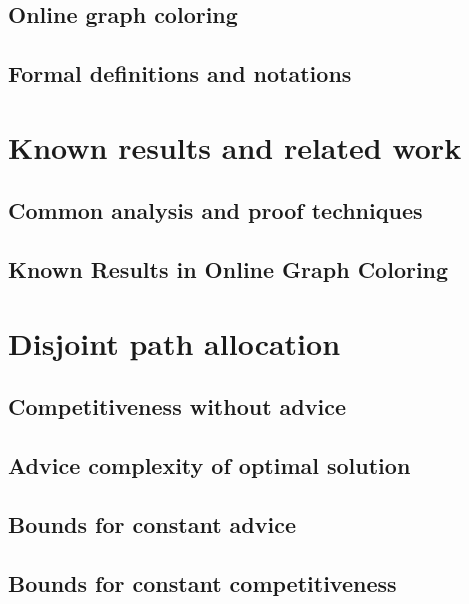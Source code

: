 \documentclass[12pt,a4paper]{report}
\begin{document}
\section{Online graph coloring}
\label{section:online-graph}

\section{Formal definitions and notations}
\label{section:definitions}


\chapter{Known results and related work}
\label{chapter:known}

\section{Common analysis and proof techniques}
\label{section:techniques}

\section{Known Results in Online Graph Coloring}
\label{section:known-graph}


\chapter{Disjoint path allocation}
\label{chapter:dpa}

\section{Competitiveness without advice}
\label{section:dpa-no-advice}

\section{Advice complexity of optimal solution}
\label{section:dpa-optimal}

\section{Bounds for constant advice}
\label{section:dpa-constant-advice}
\section{Bounds for constant competitiveness}
\label{section:dpa-constant-compet}

\end{document}
